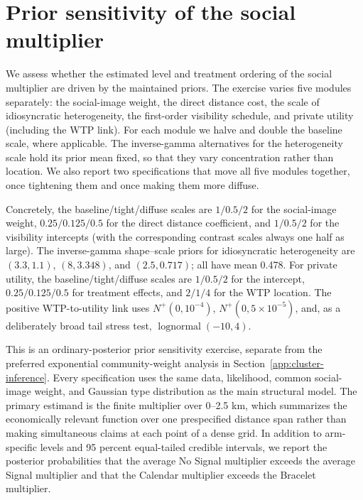 \documentclass[12pt]{article}
\begin{document}
\providecommand{\StructuralRobustnessPath}{appendix/structural-robustness}

\section{Prior sensitivity of the social multiplier}
\label{app:multiplier-prior-sensitivity}

We assess whether the estimated level and treatment ordering of the social
multiplier are driven by the maintained priors.  The exercise varies five
modules separately: the social-image weight, the direct distance cost, the
scale of idiosyncratic heterogeneity, the first-order visibility schedule, and
private utility (including the WTP link).  For each module we halve and double
the baseline scale, where applicable.  The inverse-gamma alternatives for the
heterogeneity scale hold its prior mean fixed, so that they vary concentration
rather than location. We also report two specifications that move all five
modules together, once tightening them and once making them more diffuse.

Concretely, the baseline/tight/diffuse scales are $1/0.5/2$ for the
social-image weight, $0.25/0.125/0.5$ for the direct distance coefficient,
and $1/0.5/2$ for the visibility intercepts (with the corresponding contrast
scales always one half as large).  The inverse-gamma shape--scale priors for
idiosyncratic heterogeneity are $(3.3,1.1)$, $(8,3.348)$, and
$(2.5,0.717)$;
all have mean 0.478.  For private utility, the baseline/tight/diffuse scales
are $1/0.5/2$ for the intercept, $0.25/0.125/0.5$ for treatment effects, and
$2/1/4$ for the WTP location.  The positive WTP-to-utility link uses
$N^+(0,10^{-4})$, $N^+(0,5\times10^{-5})$, and, as a deliberately broad
tail stress test, $\operatorname{lognormal}(-10,4)$.

This is an ordinary-posterior prior sensitivity exercise, separate from the
preferred exponential community-weight analysis in
Section~\ref{app:cluster-inference}.  Every specification uses the same data,
likelihood, common social-image weight, and Gaussian type distribution as the
main structural model.  The primary estimand is the finite multiplier over
0--2.5 km, which summarizes the economically relevant function over one
prespecified distance span rather than making simultaneous claims at each
point of a dense grid.  In addition to arm-specific levels and 95 percent
equal-tailed credible intervals, we report the posterior probabilities that
the average No Signal multiplier exceeds the average Signal multiplier and
that the Calendar multiplier exceeds the Bracelet multiplier.
\end{document}
